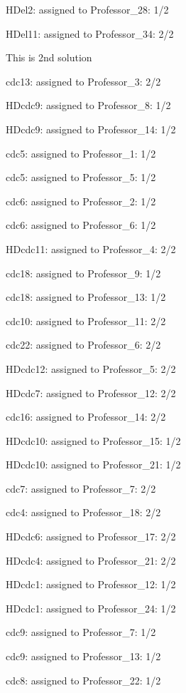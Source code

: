 \documentclass{article} %
\begin{document}
\noindent HDel2: assigned to Professor\_28: 1/2

\noindent HDel11: assigned to Professor\_34: 2/2

\noindent 

\noindent  This is 2nd solution

\noindent cdc13: assigned to Professor\_3: 2/2

\noindent HDcdc9: assigned to Professor\_8: 1/2

\noindent HDcdc9: assigned to Professor\_14: 1/2

\noindent cdc5: assigned to Professor\_1: 1/2

\noindent cdc5: assigned to Professor\_5: 1/2

\noindent cdc6: assigned to Professor\_2: 1/2

\noindent cdc6: assigned to Professor\_6: 1/2

\noindent HDcdc11: assigned to Professor\_4: 2/2

\noindent cdc18: assigned to Professor\_9: 1/2

\noindent cdc18: assigned to Professor\_13: 1/2

\noindent cdc10: assigned to Professor\_11: 2/2

\noindent cdc22: assigned to Professor\_6: 2/2

\noindent HDcdc12: assigned to Professor\_5: 2/2

\noindent HDcdc7: assigned to Professor\_12: 2/2

\noindent cdc16: assigned to Professor\_14: 2/2

\noindent HDcdc10: assigned to Professor\_15: 1/2

\noindent HDcdc10: assigned to Professor\_21: 1/2

\noindent cdc7: assigned to Professor\_7: 2/2

\noindent cdc4: assigned to Professor\_18: 2/2

\noindent HDcdc6: assigned to Professor\_17: 2/2

\noindent HDcdc4: assigned to Professor\_21: 2/2

\noindent HDcdc1: assigned to Professor\_12: 1/2

\noindent HDcdc1: assigned to Professor\_24: 1/2

\noindent cdc9: assigned to Professor\_7: 1/2

\noindent cdc9: assigned to Professor\_13: 1/2

\noindent cdc8: assigned to Professor\_22: 1/2
\end{document}
